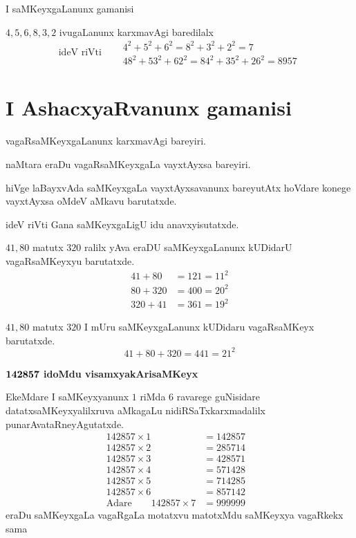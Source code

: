 I saMKeyxgaLanunx gamanisi

$4,5,6,8,3,2$ ivugaLanunx karxmavAgi baredilalx
\begin{equation*}
\text{ideV riVti}\quad
\begin{aligned}
& 4^2+5^2+6^2 = 8^2+3^2+2^2 = 7\\
& 48^2 +53^2+62^2 = 84^2+35^2+26^2 = 8957
\end{aligned}
\end{equation*}

\section*{I AshacxyaRvanunx gamanisi}


vagaRsaMKeyxgaLanunx karxmavAgi bareyiri.

\noindent naMtara eraDu vagaRsaMKeyxgaLa vayxtAyxsa bareyiri.

\noindent hiVge laBayxvAda saMKeyxgaLa vayxtAyxsavanunx bareyutAtx hoVdare konege vayxtAyxsa oMdeV aMkavu barutatxde.
\begin{center}
\begin{figure}
\end{figure}
\end{center}

ideV riVti Gana saMKeyxgaLigU idu anavxyisutatxde.
\begin{center}
\begin{figure}
\end{figure}
\end{center}

$41,80$ \;matutx\; $320$\; ralilx yAva eraDU saMKeyxgaLanunx kUDidarU vagaRsaMKeyxyu barutatxde.
\begin{align*}
41+80 &=121=11^2\\
80+320 &= 400 = 20^2\\
320+41 &=361 = 19^2
\end{align*}

$41,80$\; matutx \;$320$\; I mUru saMKeyxgaLanunx kUDidaru vagaRsaMKeyx barutatxde. 
$$
41+80+320 = 441 = 21^2
$$

\begin{flushleft}
{\bf $\bf 142857$ idoMdu visamxyakArisaMKeyx}
\end{flushleft}

EkeMdare I saMKeyxyanunx $1$ riMda $6$ ravarege guNisidare datatxsaMKeyxyalilxruva aMkagaLu nidiRSaTxkarxmadalilx punarAvataRneyAgutatxde.
\begin{align*}
142857 \times 1 &= 142857&\\
142857 \times 2 &= 285714&\\
142857 \times 3 &= 428571&\\
142857 \times 4 &= 571428&\\
142857 \times 5 &= 714285&\\
142857 \times 6 &= 857142&\\
\text{Adare}\qquad 142857 \times 7 &= 999999&
\end{align*}
eraDu saMKeyxgaLa vagaRgaLa motatxvu matotxMdu saMKeyxya vagaRkekx sama

